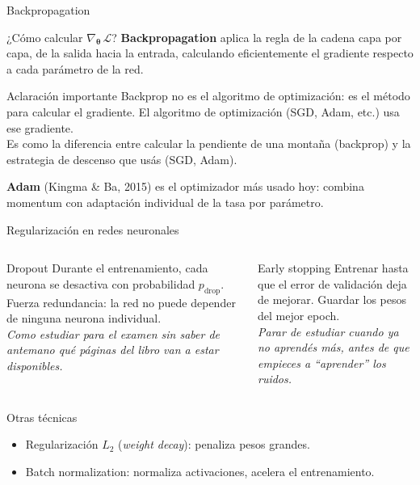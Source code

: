 \documentclass[aspectratio=169]{beamer}
\begin{document}
\begin{frame}{Backpropagation}
  \begin{block}{¿Cómo calcular $\nabla_{\bm{\theta}}\,\mathcal{L}$?}
    \textbf{Backpropagation} aplica la regla de la cadena capa por capa,
    de la salida hacia la entrada, calculando eficientemente el gradiente
    respecto a cada parámetro de la red.
  \end{block}

  \medskip
  \begin{exampleblock}{Aclaración importante}
    Backprop no es el algoritmo de optimización: es el método para calcular el gradiente.
    El algoritmo de optimización (SGD, Adam, etc.) usa ese gradiente.\\[4pt]
    Es como la diferencia entre calcular la pendiente de una montaña (backprop)
    y la estrategia de descenso que usás (SGD, Adam).
  \end{exampleblock}

  \medskip
  \textbf{Adam} (Kingma \& Ba, 2015) es el optimizador más usado hoy:
  combina momentum con adaptación individual de la tasa por parámetro.
\end{frame}

\begin{frame}{Regularización en redes neuronales}
  \begin{columns}
    \begin{block}{Dropout}
      Durante el entrenamiento, cada neurona se desactiva con probabilidad $p_{\text{drop}}$.
      Fuerza redundancia: la red no puede depender de ninguna neurona individual.\\[4pt]
      \textit{Como estudiar para el examen sin saber de antemano qué páginas del libro van a estar disponibles.}
    \end{block}

    \begin{block}{Early stopping}
      Entrenar hasta que el error de validación deja de mejorar.
      Guardar los pesos del mejor epoch.\\[4pt]
      \textit{Parar de estudiar cuando ya no aprendés más, antes de que empieces a ``aprender'' los ruidos.}
    \end{block}
  \end{columns}

  \medskip
  \begin{block}{Otras técnicas}
    \begin{itemize}
      \item Regularización $L_2$ (\textit{weight decay}): penaliza pesos grandes.
      \item Batch normalization: normaliza activaciones, acelera el entrenamiento.
    \end{itemize}
  \end{block}
\end{frame}
\end{document}

